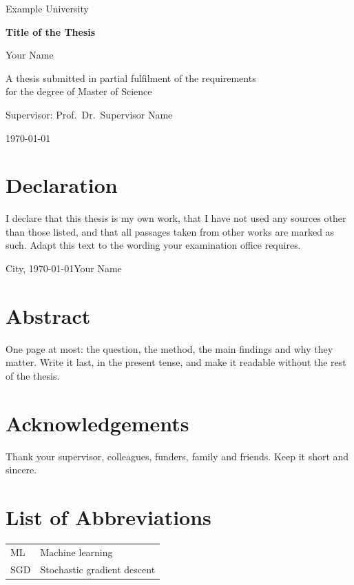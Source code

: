 \documentclass[12pt,a4paper,twoside,openright,headings=normal,numbers=noenddot]{scrbook}
\newcommand{\thesistitle}{Title of the Thesis}
\newcommand{\thesisauthor}{Your Name}
\newcommand{\thesisdegree}{Master of Science}
\newcommand{\thesisuniversity}{Example University}
\newcommand{\thesissupervisor}{Prof.\ Dr.\ Supervisor Name}
\begin{document}
\frontmatter
\begin{titlepage}
  \centering
  {\large \thesisuniversity\par}
  \vspace{3cm}
  {\Huge\bfseries \thesistitle\par}
  \vspace{2cm}
  {\Large \thesisauthor\par}
  \vfill
  A thesis submitted in partial fulfilment of the requirements\\
  for the degree of \thesisdegree\par
  \vspace{1cm}
  Supervisor: \thesissupervisor\par
  \vspace{0.5cm}
  \today
\end{titlepage}

\chapter*{Declaration}
I declare that this thesis is my own work, that I have not used any sources other than
those listed, and that all passages taken from other works are marked as such. Adapt this
text to the wording your examination office requires.

\bigskip\noindent City, \today \hfill \thesisauthor

\chapter*{Abstract}
One page at most: the question, the method, the main findings and why they matter.
Write it last, in the present tense, and make it readable without the rest of the thesis.

\chapter*{Acknowledgements}
Thank your supervisor, colleagues, funders, family and friends. Keep it short and sincere.

\tableofcontents
\listoffigures
\listoftables

\chapter*{List of Abbreviations}
\begin{tabular}{@{}ll@{}}
  ML  & Machine learning \\
  SGD & Stochastic gradient descent \\
\end{tabular}

\mainmatter




\appendix


\backmatter
\printbibliography[heading=bibintoc]
\end{document}
